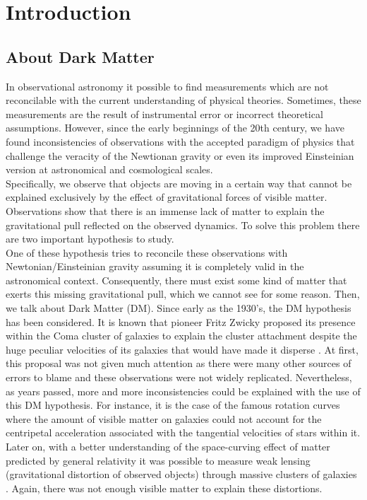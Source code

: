 \chapter{Introduction}

\section{About Dark Matter}

In observational astronomy it possible to find measurements which are not reconcilable with the current understanding of physical theories. Sometimes, these measurements are the result of instrumental error or incorrect theoretical assumptions. However, since the early beginnings of the 20th century, we have found inconsistencies of observations with the accepted paradigm of physics that challenge the veracity of the Newtionan gravity or even its improved Einsteinian version at astronomical and cosmological scales.\\

Specifically, we observe that objects are moving in a certain way that cannot be explained exclusively by the effect of gravitational forces of visible matter. Observations show that there is an immense lack of matter to explain the gravitational pull reflected on the observed dynamics. To solve this problem there are two important hypothesis to study.\\

One of these hypothesis tries to reconcile these observations with Newtonian/Einsteinian gravity assuming it is completely valid in the astronomical context. Consequently, there must exist some kind of matter that exerts this missing gravitational pull, which we cannot see for some reason. Then, we talk about Dark Matter (DM). Since early as the 1930's, the DM hypothesis has been considered. It is known that pioneer Fritz Zwicky proposed its presence within the Coma cluster of galaxies to explain the cluster attachment despite the huge peculiar velocities of its galaxies that would have made it disperse \cite{Zwicky_1937}. At first, this proposal was not given much attention as there were many other sources of errors to blame and these observations were not widely replicated. Nevertheless, as years passed, more and more inconsistencies could be explained with the use of this DM hypothesis. For instance, it is the case of the famous rotation curves \cite{Faber_and_Gallagher_1979,Rubin_et_al._1980,Persic_et_al._1996} where the amount of visible matter on galaxies could not account for the centripetal acceleration associated with the tangential velocities of stars within it. Later on, with a better understanding of the space-curving effect of matter predicted by general relativity it was possible to measure weak lensing (gravitational distortion of observed objects) through massive clusters of galaxies \cite{Kaiser_and_Squires,Wittman_et_al._2000,Clowe_et_al._2006}. Again, there was not enough visible matter to explain these distortions.\\

